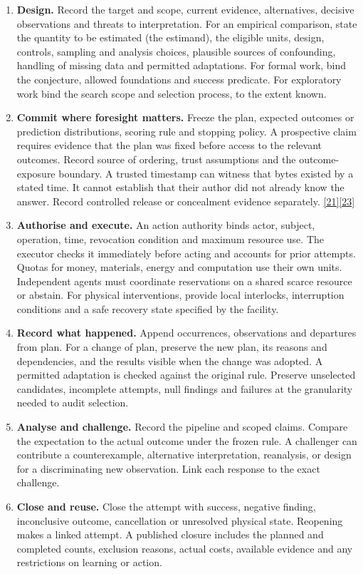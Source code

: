 \documentclass[11pt,a4paper]{article}
\newcommand{\src}[1]{\hyperlink{ref#1}{[#1]}}
\begin{document}
\begin{enumerate}
\item \textbf{Design.} Record the target and scope, current evidence, alternatives, decisive observations and threats to interpretation. For an empirical comparison, state the quantity to be estimated (the estimand), the eligible units, design, controls, sampling and analysis choices, plausible sources of confounding, handling of missing data and permitted adaptations. For formal work, bind the conjecture, allowed foundations and success predicate. For exploratory work bind the search scope and selection process, to the extent known.
\item \textbf{Commit where foresight matters.} Freeze the plan, expected outcomes or prediction distributions, scoring rule and stopping policy. A prospective claim requires evidence that the plan was fixed before access to the relevant outcomes. Record source of ordering, trust assumptions and the outcome-exposure boundary. A trusted timestamp can witness that bytes existed by a stated time. It cannot establish that their author did not already know the answer. Record controlled release or concealment evidence separately. \src{21}\src{23}
\item \textbf{Authorise and execute.} An action authority binds actor, subject, operation, time, revocation condition and maximum resource use. The executor checks it immediately before acting and accounts for prior attempts. Quotas for money, materials, energy and computation use their own units. Independent agents must coordinate reservations on a shared scarce resource or abstain. For physical interventions, provide local interlocks, interruption conditions and a safe recovery state specified by the facility.
\item \textbf{Record what happened.} Append occurrences, observations and departures from plan. For a change of plan, preserve the new plan, its reasons and dependencies, and the results visible when the change was adopted. A permitted adaptation is checked against the original rule. Preserve unselected candidates, incomplete attempts, null findings and failures at the granularity needed to audit selection.
\item \textbf{Analyse and challenge.} Record the pipeline and scoped claims. Compare the expectation to the actual outcome under the frozen rule. A challenger can contribute a counterexample, alternative interpretation, reanalysis, or design for a discriminating new observation. Link each response to the exact challenge.
\item \textbf{Close and reuse.} Close the attempt with success, negative finding, inconclusive outcome, cancellation or unresolved physical state. Reopening makes a linked attempt. A published closure includes the planned and completed counts, exclusion reasons, actual costs, available evidence and any restrictions on learning or action.
\end{enumerate}
\end{document}

